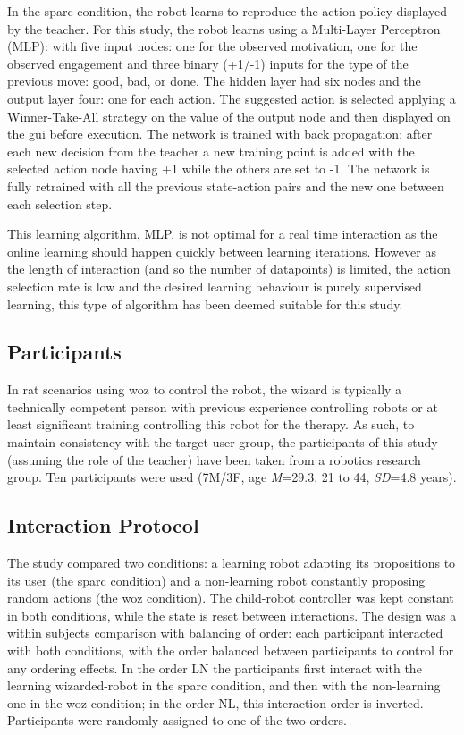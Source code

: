 In the \gls{sparc} condition, the robot learns to reproduce the action policy displayed by the teacher. For this study, the robot learns using a Multi-Layer Perceptron (MLP): with five input nodes: one for the observed motivation, one for the observed engagement and three binary (+1/-1) inputs for the type of the previous move: good, bad, or done. The hidden layer had six nodes and the output layer four: one for each action. The suggested action is selected applying a Winner-Take-All strategy on the value of the output node and then displayed on the \gls{gui} before execution. The network is trained with back propagation: after each new decision from the teacher a new training point is added with the selected action node having +1 while the others are set to -1. The network is fully retrained with all the previous state-action pairs and the new one between each selection step. 

This learning algorithm, MLP, is not optimal for a real time interaction as the online learning should happen quickly between learning iterations. However as the length of interaction (and so the number of datapoints) is limited, the action selection rate is low and the desired learning behaviour is purely supervised learning, this type of algorithm has been deemed suitable for this study.

\subsection{Participants}

In \gls{rat} scenarios using \gls{woz} to control the robot, the wizard is typically a technically competent person with previous experience controlling robots or at least significant training controlling this robot for the therapy. As such, to maintain consistency with the target user group, the participants of this study (assuming the role of the teacher) have been taken from a robotics research group. Ten participants were used (7M/3F, age \textit{M}=29.3, 21 to 44, \textit{SD}=4.8 years).

\subsection{Interaction Protocol}

The study compared two conditions: a learning robot adapting its propositions to its user (the \gls{sparc} condition) and a non-learning robot constantly proposing random actions (the \gls{woz} condition). The child-robot controller was kept constant in both conditions, while the state is reset between interactions. The design was a within subjects comparison with balancing of order: each participant interacted with both conditions, with the order balanced between participants to control for any ordering effects. In the order LN the participants first interact with the learning wizarded-robot in the \gls{sparc} condition, and then with the non-learning one in the \gls{woz} condition; in the order NL, this interaction order is inverted. Participants were randomly assigned to one of the two orders.

